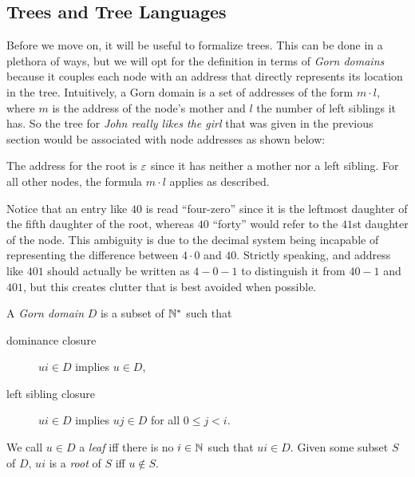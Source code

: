 \subsection{Trees and Tree Languages}

Before we move on, it will be useful to formalize trees.
This can be done in a plethora of ways, but we will opt for the definition in terms of \emph{Gorn domains} \citep{Gorn67} because it couples each node with an address that directly represents its location in the tree.
Intuitively, a Gorn domain is a set of addresses of the form $m \cdot l$, where $m$ is the address of the node's mother and $l$ the number of left siblings it has.
So the tree for \emph{John really likes the girl} that was given in the previous section would be associated with node addresses as shown below:
%
\begin{center}
    
\end{center}
%
The address for the root is $\varepsilon$ since it has neither a mother nor a left sibling.
For all other nodes, the formula $m \cdot l$ applies as described.

Notice that an entry like $40$ is read ``four-zero'' since it is the leftmost daughter of the fifth daughter of the root, whereas $40$ ``forty'' would refer to the $41$st daughter of the node.
This ambiguity is due to the decimal system being incapable of representing the difference between $4 \cdot 0$ and $40$.
Strictly speaking, and address like $401$ should actually be written as $4-0-1$ to distinguish it from $40-1$ and $401$, but this creates clutter that is best avoided when possible.
%
\begin{definition}
    A \emph{Gorn domain} $D$ is a subset of $\mathbb{N}^*$ such that
    \begin{description}
        \item[dominance closure] $ui \in D$ implies $u \in D$,
        \item[left sibling closure] $ui \in D$ implies $uj \in D$ for all $0 \leq j < i$.
    \end{description}
    We call $u \in D$ a \emph{leaf} iff there is no $i \in \mathbb{N}$ such that $ui \in D$.
    Given some subset $S$ of $D$, $ui$ is a \emph{root} of $S$ iff $u \notin S$.
\end{definition}

